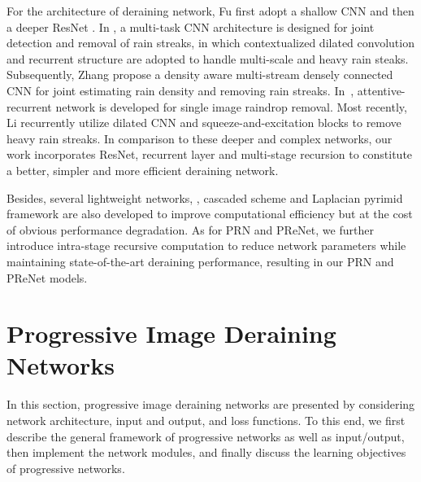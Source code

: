\documentclass[10pt,twocolumn,letterpaper]{article}
\begin{document}
For the architecture of deraining network, Fu \etal first adopt a shallow CNN \cite{fu2017clearing} and then a deeper ResNet \cite{fu2017removing}.
In \cite{yang2017deep}, a multi-task CNN architecture is designed for joint detection and removal of rain streaks, in which contextualized dilated convolution and recurrent structure are adopted to handle multi-scale and heavy rain steaks.
Subsequently, Zhang \etal \cite{zhang2018density} propose a density aware multi-stream densely connected CNN for joint estimating rain density and removing rain streaks.
In~\cite{qian2018attentive}, attentive-recurrent network is developed for single image raindrop removal.
Most recently, Li \etal \cite{li2018recurrent} recurrently utilize dilated CNN and squeeze-and-excitation blocks to remove heavy rain streaks.
In comparison to these deeper and complex networks, our work incorporates ResNet, recurrent layer and multi-stage recursion to constitute a better, simpler and more efficient deraining network.


Besides, several lightweight networks, \eg, cascaded scheme \cite{fan2018residual} and Laplacian pyrimid framework \cite{fu2018lightweight} are also developed to improve computational efficiency but at the cost of obvious performance degradation.
As for PRN and PReNet, we further introduce intra-stage recursive computation to reduce network parameters while maintaining state-of-the-art deraining performance, resulting in our PRN and PReNet models.













\section{Progressive Image Deraining Networks}
In this section, progressive image deraining networks are presented by considering network architecture, input and output, and loss functions.
To this end, we first describe the general framework of progressive networks as well as input/output, then implement the network modules, and finally discuss the learning objectives of progressive networks.
\end{document}
